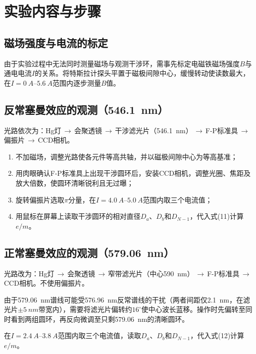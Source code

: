 \documentclass[a4paper,8pt,twocolumn]{article}
\begin{document}
\section{实验内容与步骤}

\subsection{磁场强度与电流的标定}

由于实验过程中无法同时测量磁场与观测干涉环，需事先标定电磁铁磁场强度$B$与通电电流$I$的关系。将特斯拉计探头平置于磁极间隙中心，缓慢转动使读数最大，在$I = \SIrange{0}{5.6}{A}$范围内逐步测量$B$值。

\subsection{反常塞曼效应的观测（\SI{546.1}{nm}）}

光路依次为：Hg灯\,$\to$\,会聚透镜\,$\to$\,干涉滤光片（\SI{546.1}{nm}）\,$\to$\,F-P标准具\,$\to$\,偏振片\,$\to$\,CCD相机。

\begin{enumerate}[label=(\arabic*)]
  \item 不加磁场，调整光路使各元件等高共轴，并以磁极间隙中心为等高基准；
  \item 用肉眼确认F-P标准具上出现干涉圆环后，安装CCD相机，调整光圈、焦距及放大倍数，使圆环清晰锐利且无过曝；
  \item 旋转偏振片选取$\pi$分量，在$I = \SIrange{4.0}{5.0}{A}$范围内取三个电流值；
  \item 用鼠标在屏幕上读取干涉圆环的相对直径$D_a$、$D_b$和$D_{N-1}$，代入式(11)计算$e/m$。
\end{enumerate}

\subsection{正常塞曼效应的观测（\SI{579.06}{nm}）}

光路改为：Hg灯\,$\to$\,会聚透镜\,$\to$\,窄带滤光片（中心\SI{590}{nm}）\,$\to$\,F-P标准具\,$\to$\,CCD相机。不使用偏振片。

由于\SI{579.06}{nm}谱线可能受\SI{576.96}{nm}反常谱线的干扰（两者间距仅\SI{2.1}{nm}，在滤光片$\pm\SI{5}{nm}$带宽内），需要将滤光片偏转约$16^\circ$使中心波长蓝移。操作时先偏转至同时看到两组圆环，再反向微调至只剩\SI{579.06}{nm}的清晰圆环。

在$I = \SIrange{2.4}{3.8}{A}$范围内取三个电流值，读取$D_a$、$D_b$和$D_{N-1}$，代入式(12)计算$e/m$。
\end{document}
